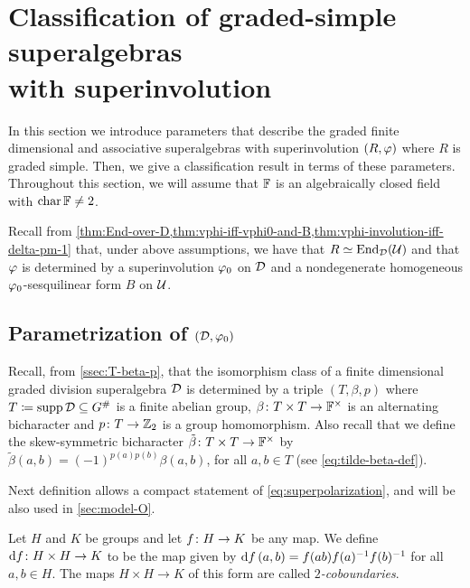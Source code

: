
\section{Classification of graded-simple superalgebras\texorpdfstring{\\}{} with superinvolution}\label{sec:classification-grd-simple-with-sinv}

In this section we introduce parameters that describe the graded finite dimensional and associative superalgebras with superinvolution $(R, \varphi)$ where $R$ is graded simple.
Then, we give a classification result in terms of these parameters.
Throughout this section, we will assume that $\mathbb{F}$ is an algebraically closed field with $\operatorname{char} \mathbb{F} \neq 2$.

Recall from \cref{thm:End-over-D,thm:vphi-iff-vphi0-and-B,thm:vphi-involution-iff-delta-pm-1}
that, under above assumptions, we have that $R \simeq \operatorname{End}_{\mathcal{D}} (\mathcal U)$ and that $\varphi$ is determined by a superinvolution $\varphi_0$ on $\mathcal{D}$ and a nondegenerate homogeneous $\varphi_0$-sesquilinear form $B$ on $\mathcal U$.

\subsection{Parametrization of \texorpdfstring{$(\mathcal{D}, \varphi_0)$}{(D, phi0)}}\label{ssec:param-D-vphi}

Recall, from \cref{ssec:T-beta-p}, that the isomorphism class of a finite dimensional graded division superalgebra $\mathcal{D}$ is determined by a triple $(T, \beta, p)$ where $T \coloneqq \operatorname{supp} \mathcal{D} \subseteq G^\#$ is a finite abelian group, $\beta\colon T\times T \to \mathbb{F}^\times$ is an alternating bicharacter and $p\colon T \to \mathbb{Z}_2$ is a group homomorphism. 
Also recall that we define the skew-symmetric bicharacter $\tilde\beta \colon T\times T \to \mathbb{F}^\times$ by $\tilde\beta (a,b) = (-1)^{p(a) p(b)} \beta(a, b)$, for all $a, b \in T$ (see \cref{eq:tilde-beta-def}). 

Next definition allows a compact statement of \cref{eq:superpolarization}, and will be also used in \cref{sec:model-O}.


\begin{defi}\label{def:coboundary}
	Let $H$ and $K$ be groups and let $f\colon H \to K$ be any map.
	We define $\mathrm{d} f\colon H\times H \to K$ to be the map given by $\mathrm{d} f\, (a,b) = f(ab)f(a)^{-1} f(b)^{-1}$ for all $a,b \in H$.
	The maps $H\times H \to K$ of this form are called \emph{$2$-coboundaries}.
\end{defi}

